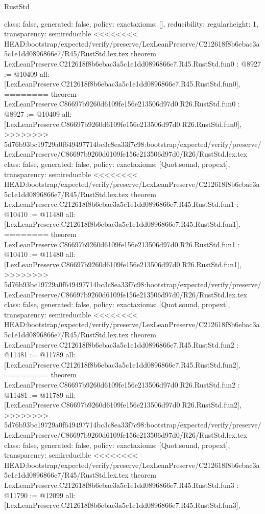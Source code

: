 \begin{lexlean}{RustStd}
\begin{coremodule}
{\begin{coremodule}
{{{  class: false,
  generated: false,
  policy: exact{axioms: []},
  reducibility: regular{height: 1},
  transparency: semireducible
}
<<<<<<<< HEAD:bootstrap/expected/verify/preserve/LexLeanPreserve/C212618f8b6ebac3a5c1e1dd0896866e7/R45/RustStd.lex.tex
theorem LexLeanPreserve.C212618f8b6ebac3a5c1e1dd0896866e7.R45.RustStd.fun0 : @8927 := @10409 {
  all: [LexLeanPreserve.C212618f8b6ebac3a5c1e1dd0896866e7.R45.RustStd.fun0],
========
theorem LexLeanPreserve.C86697b9260d6109fe156e213506d97d0.R26.RustStd.fun0 : @8927 := @10409 {
  all: [LexLeanPreserve.C86697b9260d6109fe156e213506d97d0.R26.RustStd.fun0],
>>>>>>>> 5d76b93bc19729a0f649497714bc3c8ea33f7c98:bootstrap/expected/verify/preserve/LexLeanPreserve/C86697b9260d6109fe156e213506d97d0/R26/RustStd.lex.tex
  class: false,
  generated: false,
  policy: exact{axioms: [Quot.sound, propext]},
  transparency: semireducible
}
<<<<<<<< HEAD:bootstrap/expected/verify/preserve/LexLeanPreserve/C212618f8b6ebac3a5c1e1dd0896866e7/R45/RustStd.lex.tex
theorem LexLeanPreserve.C212618f8b6ebac3a5c1e1dd0896866e7.R45.RustStd.fun1 : @10410 := @11480 {
  all: [LexLeanPreserve.C212618f8b6ebac3a5c1e1dd0896866e7.R45.RustStd.fun1],
========
theorem LexLeanPreserve.C86697b9260d6109fe156e213506d97d0.R26.RustStd.fun1 : @10410 := @11480 {
  all: [LexLeanPreserve.C86697b9260d6109fe156e213506d97d0.R26.RustStd.fun1],
>>>>>>>> 5d76b93bc19729a0f649497714bc3c8ea33f7c98:bootstrap/expected/verify/preserve/LexLeanPreserve/C86697b9260d6109fe156e213506d97d0/R26/RustStd.lex.tex
  class: false,
  generated: false,
  policy: exact{axioms: [Quot.sound, propext]},
  transparency: semireducible
}
<<<<<<<< HEAD:bootstrap/expected/verify/preserve/LexLeanPreserve/C212618f8b6ebac3a5c1e1dd0896866e7/R45/RustStd.lex.tex
theorem LexLeanPreserve.C212618f8b6ebac3a5c1e1dd0896866e7.R45.RustStd.fun2 : @11481 := @11789 {
  all: [LexLeanPreserve.C212618f8b6ebac3a5c1e1dd0896866e7.R45.RustStd.fun2],
========
theorem LexLeanPreserve.C86697b9260d6109fe156e213506d97d0.R26.RustStd.fun2 : @11481 := @11789 {
  all: [LexLeanPreserve.C86697b9260d6109fe156e213506d97d0.R26.RustStd.fun2],
>>>>>>>> 5d76b93bc19729a0f649497714bc3c8ea33f7c98:bootstrap/expected/verify/preserve/LexLeanPreserve/C86697b9260d6109fe156e213506d97d0/R26/RustStd.lex.tex
  class: false,
  generated: false,
  policy: exact{axioms: [Quot.sound, propext]},
  transparency: semireducible
}
<<<<<<<< HEAD:bootstrap/expected/verify/preserve/LexLeanPreserve/C212618f8b6ebac3a5c1e1dd0896866e7/R45/RustStd.lex.tex
theorem LexLeanPreserve.C212618f8b6ebac3a5c1e1dd0896866e7.R45.RustStd.fun3 : @11790 := @12099 {
  all: [LexLeanPreserve.C212618f8b6ebac3a5c1e1dd0896866e7.R45.RustStd.fun3],
}}}}}}
\end{coremodule}}
\end{coremodule}
\end{lexlean}

